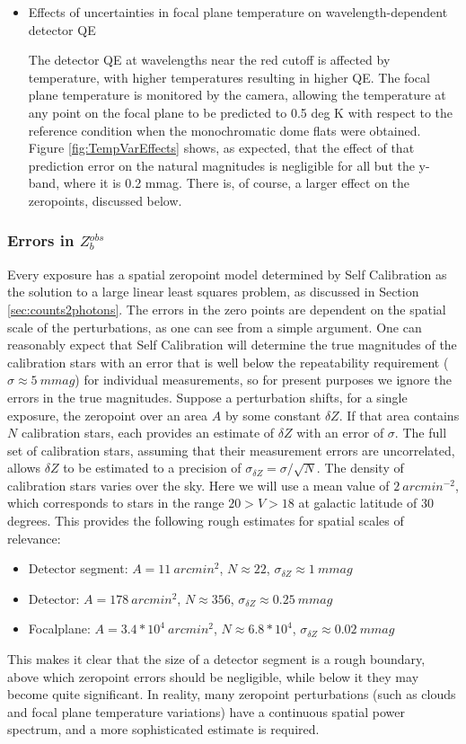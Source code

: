 \documentclass[12pt,preprint]{aastex}
\begin{document}
\begin{itemize}
\item{Effects of uncertainties in focal plane temperature on wavelength-dependent detector QE}

The detector QE at wavelengths near the red cutoff is affected by temperature, with higher temperatures resulting in higher QE.
The focal plane temperature is monitored by the camera, allowing the temperature at any point on the focal plane to be predicted to
0.5 deg K with respect to the reference condition when the monochromatic dome flats were obtained.  Figure \ref{fig:TempVarEffects}
shows, as expected, that the effect of that prediction error on the natural magnitudes is negligible for all but the y-band, where 
it is 0.2 mmag.   There is, of course, a larger effect on the zeropoints, discussed below.

\end{itemize}

\subsubsection{Errors in $Z_b^{obs}$}
Every exposure has a spatial zeropoint model determined by Self Calibration as the solution to a large linear least squares problem, as discussed in Section \ref{sec:counts2photons}.  The errors in the zero points are dependent on the spatial scale of the perturbations, as one can see from a simple argument.  One can reasonably expect that Self Calibration will determine the true magnitudes of the calibration stars with an error that is well below the repeatability requirement ($\sigma \approx 5~mmag$) for individual measurements, so for present purposes we ignore the errors in the true magnitudes.  Suppose a perturbation shifts, for a single exposure, the zeropoint over an area $A$ by some constant $\delta Z$.   If that area contains $N$ calibration stars, each provides an estimate of $\delta Z$ with an error of $\sigma$.   The full set of calibration stars, assuming that their measurement errors are uncorrelated, allows $\delta Z$ to be estimated to a precision of $\sigma_{\delta Z} = \sigma / \sqrt{N}$.  The density of calibration stars varies over the sky.  Here we will use a mean value of $2~arcmin^{-2}$, which corresponds to stars in the range $20 > V > 18$ at galactic latitude of 30 degrees. This provides the following rough estimates for spatial scales of relevance:
\begin{itemize}
\item{Detector segment:  $A=11~arcmin^2$, $N \approx 22$, $\sigma_{\delta Z} \approx 1~mmag$}
\item{Detector: $A=178~arcmin^2$, $N \approx 356$, $\sigma_{\delta Z} \approx 0.25~mmag$}
\item{Focalplane: $A=3.4*10^4~arcmin^2$, $N \approx 6.8*10^4$, $\sigma_{\delta Z} \approx 0.02~mmag$}
\end{itemize}
This makes it clear that the size of a detector segment is a rough boundary, above which zeropoint errors should be negligible,
while below it they may become quite significant.  In reality, many zeropoint perturbations (such as clouds and focal plane temperature variations) have a continuous spatial power spectrum, and a more sophisticated estimate is required.  
\end{document}
